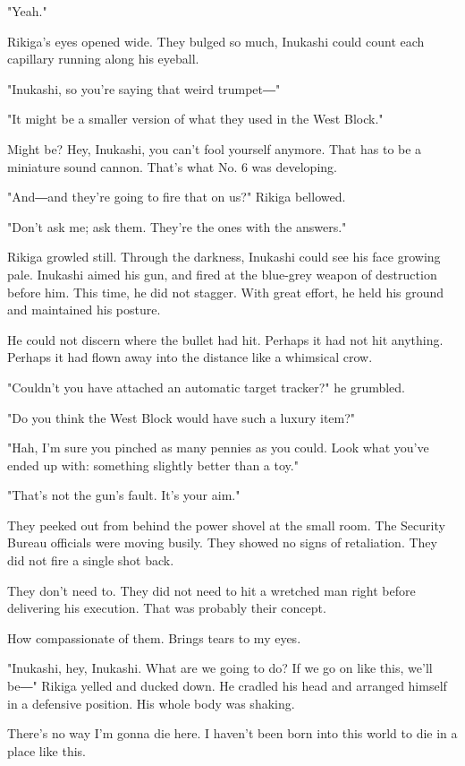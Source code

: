 "Yeah."

Rikiga's eyes opened wide. They bulged so much, Inukashi could count
each capillary running along his eyeball.

"Inukashi, so you're saying that weird trumpet―"

"It might be a smaller version of what they used in the West Block."

Might be? Hey, Inukashi, you can't fool yourself anymore. That has to be
a miniature sound cannon. That's what No. 6 was developing.

"And―and they're going to fire that on us?" Rikiga bellowed.

"Don't ask me; ask them. They're the ones with the answers."

Rikiga growled still. Through the darkness, Inukashi could see his face
growing pale. Inukashi aimed his gun, and fired at the blue-grey weapon
of destruction before him. This time, he did not stagger. With great
effort, he held his ground and maintained his posture.

He could not discern where the bullet had hit. Perhaps it had not hit
anything. Perhaps it had flown away into the distance like a whimsical
crow.

"Couldn't you have attached an automatic target tracker?" he grumbled.

"Do you think the West Block would have such a luxury item?"

"Hah, I'm sure you pinched as many pennies as you could. Look what
you've ended up with: something slightly better than a toy."

"That's not the gun's fault. It's your aim."

They peeked out from behind the power shovel at the small room. The
Security Bureau officials were moving busily. They showed no signs of
retaliation. They did not fire a single shot back.

They don't need to. They did not need to hit a wretched man right before
delivering his execution. That was probably their concept.

How compassionate of them. Brings tears to my eyes.

"Inukashi, hey, Inukashi. What are we going to do? If we go on like
this, we'll be―" Rikiga yelled and ducked down. He cradled his head and
arranged himself in a defensive position. His whole body was shaking.

There's no way I'm gonna die here. I haven't been born into this world
to die in a place like this.


